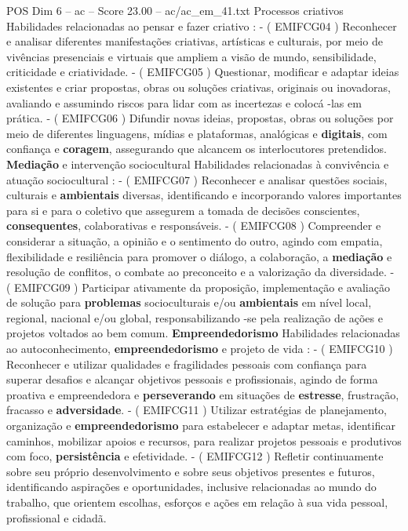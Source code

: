 \begin{textsample}{POS Dim 6 – ac – Score 23.00 – ac/ac\_em\_41.txt}
Processos criativos Habilidades relacionadas ao pensar e fazer criativo : - ( EMIFCG04 ) Reconhecer e analisar diferentes manifestações criativas, artísticas e culturais, por meio de vivências presenciais e virtuais que ampliem a visão de mundo, sensibilidade, criticidade e criatividade. - ( EMIFCG05 ) Questionar, modificar e adaptar ideias existentes e criar propostas, obras ou soluções criativas, originais ou inovadoras, avaliando e assumindo riscos para lidar com as incertezas e colocá -las em prática. - ( EMIFCG06 ) Difundir novas ideias, propostas, obras ou soluções por meio de diferentes linguagens, mídias e plataformas, analógicas e \textbf{digitais}, com confiança e \textbf{coragem}, assegurando que alcancem os interlocutores pretendidos. \textbf{Mediação} e intervenção sociocultural Habilidades relacionadas à convivência e atuação sociocultural : - ( EMIFCG07 ) Reconhecer e analisar questões sociais, culturais e \textbf{ambientais} diversas, identificando e incorporando valores importantes para si e para o coletivo que assegurem a tomada de decisões conscientes, \textbf{consequentes}, colaborativas e responsáveis. - ( EMIFCG08 ) Compreender e considerar a situação, a opinião e o sentimento do outro, agindo com empatia, flexibilidade e resiliência para promover o diálogo, a colaboração, a \textbf{mediação} e resolução de conflitos, o combate ao preconceito e a valorização da diversidade. - ( EMIFCG09 ) Participar ativamente da proposição, implementação e avaliação de solução para \textbf{problemas} socioculturais e/ou \textbf{ambientais} em nível local, regional, nacional e/ou global, responsabilizando -se pela realização de ações e projetos voltados ao bem comum. \textbf{Empreendedorismo} Habilidades relacionadas ao autoconhecimento, \textbf{empreendedorismo} e projeto de vida : - ( EMIFCG10 ) Reconhecer e utilizar qualidades e fragilidades pessoais com confiança para superar desafios e alcançar objetivos pessoais e profissionais, agindo de forma proativa e empreendedora e \textbf{perseverando} em situações de \textbf{estresse}, frustração, fracasso e \textbf{adversidade}. - ( EMIFCG11 ) Utilizar estratégias de planejamento, organização e \textbf{empreendedorismo} para estabelecer e adaptar metas, identificar caminhos, mobilizar apoios e recursos, para realizar projetos pessoais e produtivos com foco, \textbf{persistência} e efetividade. - ( EMIFCG12 ) Refletir continuamente sobre seu próprio desenvolvimento e sobre seus objetivos presentes e futuros, identificando aspirações e oportunidades, inclusive relacionadas ao mundo do trabalho, que orientem escolhas, esforços e ações em relação à sua vida pessoal, profissional e cidadã.

\end{textsample}
